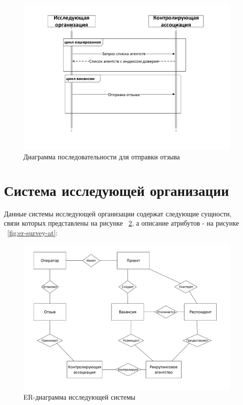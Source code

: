 \begin{figure}[ht]
  \centering
  \includegraphics[width=\textwidth]{include/sequence2.pdf}
\caption{Диаграмма последовательности для отправки отзыва}
\label{fig:sequence2}
\end{figure}

\section{Система исследующей организации}
Данные системы исследующей организации содержат следующие сущности, связи которых представлены на рисунке ~\ref{fig:er-survey}, а описание атрибутов - на рисунке ~\ref{fig:er-survey-at}:

\begin{figure}[ht]
  \centering
  \includegraphics[width=\textwidth]{include/er-survey.pdf}
\caption{ER-диаграмма исследующей системы}
\label{fig:er-survey}
\end{figure}

